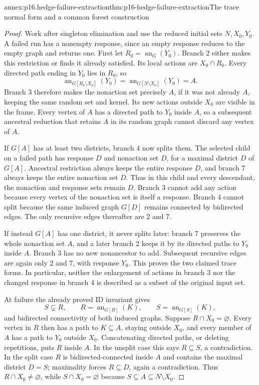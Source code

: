 \begin{annexitem}{annex:p16.hedge-failure-extraction}{thm:p16-hedge-failure-extraction}{The trace normal form and a common forest construction}
\begin{proof}
Work after singleton elimination and use the reduced initial sets
\(N,X_0,Y_0\). A failed run has a nonempty response, since an
empty response reduces to the empty graph and returns one. First
let \(R_0=\operatorname{an}_G(Y_0)\). Branch 2 either makes
this restriction or finds it already satisfied. Its local actions
are \(X_0\cap R_0\). Every directed path ending in \(Y_0\)
lies in \(R_0\), so
\[
 \operatorname{an}_{G[R_0\setminus X_0]}(Y_0)
   =\operatorname{an}_{G[N\setminus X_0]}(Y_0)=A.
\]
Branch 3 therefore makes the nonaction set precisely \(A\),
if it was not already \(A\), keeping the same random set and
kernel. Its new actions outside \(X_0\) are visible in the frame.
Every vertex of \(A\) has a directed path to \(Y_0\) inside
\(A\), so a subsequent ancestral reduction that retains \(A\)
in its random graph cannot discard any vertex of \(A\).

If \(G[A]\) has at least two districts, branch 4 now splits them.
The selected child on a failed path has response \(D\) and
nonaction set \(D\), for a maximal district \(D\) of \(G[A]\).
Ancestral restriction always keeps the entire response \(D\),
and branch 7 always keeps the entire nonaction set \(D\).
Thus in this child and every descendant, the nonaction and response
sets remain \(D\). Branch 3 cannot add any action because every
vertex of the nonaction set is itself a response. Branch 4 cannot
split because the same induced graph \(G[D]\) remains connected
by bidirected edges. The only recursive edges thereafter are 2 and 7.

If instead \(G[A]\) has one district, it never splits later:
branch 7 preserves the whole nonaction set \(A\), and a later
branch 2 keeps it by its directed paths to \(Y_0\) inside
\(A\). Branch 3 has no new nonancestor to add. Subsequent
recursive edges are again only 2 and 7, with response \(Y_0\).
This proves the two claimed trace forms. In particular, neither
the enlargement of actions in branch 3 nor the changed response
in branch 4 is described as a subset of the original input set.

At failure the already proved ID invariant gives
\[
 S\subsetneq R,\qquad R=\operatorname{an}_{G[R]}(K),\qquad
 S=\operatorname{an}_{G[S]}(K),
\]
and bidirected connectivity of both induced graphs. Suppose
\(R\cap X_0=\varnothing\). Every vertex in \(R\) then has
a path to \(K\subseteq A\), staying outside \(X_0\), and
every member of \(A\) has a path to \(Y_0\) outside \(X_0\).
Concatenating directed paths, or deleting repetitions, puts \(R\)
inside \(A\). In the unsplit case this says \(R\subseteq S\),
a contradiction. In the split case \(R\) is bidirected-connected
inside \(A\) and contains the maximal district \(D=S\);
maximality forces \(R\subseteq D\), again a contradiction.
Thus \(R\cap X_0\ne\varnothing\), while \(S\cap X_0=\varnothing\)
because \(S\subseteq A\subseteq N\setminus X_0\).


\end{proof}
\end{annexitem}
